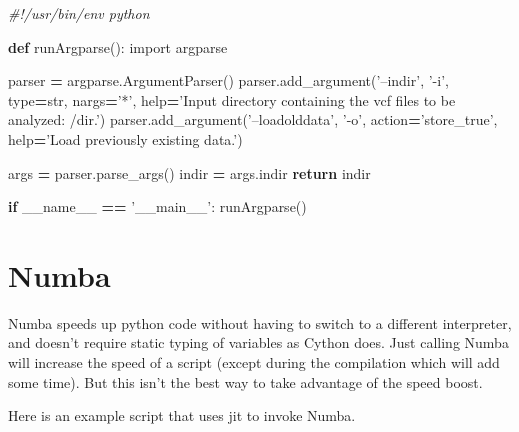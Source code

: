 \documentclass[]{book}
\newenvironment{Shaded}{\begin{snugshade}}{\end{snugshade}}
\newcommand{\BuiltInTok}[1]{#1}
\newcommand{\CommentTok}[1]{\textcolor[rgb]{0.56,0.35,0.01}{\textit{#1}}}
\newcommand{\ControlFlowTok}[1]{\textcolor[rgb]{0.13,0.29,0.53}{\textbf{#1}}}
\newcommand{\ImportTok}[1]{#1}
\newcommand{\KeywordTok}[1]{\textcolor[rgb]{0.13,0.29,0.53}{\textbf{#1}}}
\newcommand{\NormalTok}[1]{#1}
\newcommand{\OperatorTok}[1]{\textcolor[rgb]{0.81,0.36,0.00}{\textbf{#1}}}
\newcommand{\StringTok}[1]{\textcolor[rgb]{0.31,0.60,0.02}{#1}}
\newcommand{\VariableTok}[1]{\textcolor[rgb]{0.00,0.00,0.00}{#1}}
\begin{document}
\begin{Shaded}
\begin{Highlighting}[]
\CommentTok{#!/usr/bin/env python}

\KeywordTok{def}\NormalTok{ runArgparse():}
\ImportTok{import}\NormalTok{ argparse}

\NormalTok{parser }\OperatorTok{=}\NormalTok{ argparse.ArgumentParser()}
\NormalTok{parser.add_argument(}\StringTok{'--indir'}\NormalTok{, }\StringTok{'-i'}\NormalTok{, }\BuiltInTok{type}\OperatorTok{=}\BuiltInTok{str}\NormalTok{, nargs}\OperatorTok{=}\StringTok{'*'}\NormalTok{, }\BuiltInTok{help}\OperatorTok{=}\StringTok{'Input directory containing the vcf files to be analyzed: /dir.'}\NormalTok{)}
\NormalTok{parser.add_argument(}\StringTok{'--loadolddata'}\NormalTok{, }\StringTok{'-o'}\NormalTok{, action}\OperatorTok{=}\StringTok{'store_true'}\NormalTok{, }\BuiltInTok{help}\OperatorTok{=}\StringTok{'Load previously existing data.'}\NormalTok{)}

\NormalTok{args }\OperatorTok{=}\NormalTok{ parser.parse_args()}
\NormalTok{indir }\OperatorTok{=}\NormalTok{ args.indir}
\ControlFlowTok{return}\NormalTok{ indir}

\ControlFlowTok{if} \VariableTok{__name__} \OperatorTok{==} \StringTok{'__main__'}\NormalTok{:}
\NormalTok{    runArgparse()}
\end{Highlighting}
\end{Shaded}

\hypertarget{numba}{%
\section{Numba}\label{numba}}

Numba speeds up python code without having to switch to a different interpreter, and doesn't require static typing of variables as Cython does. Just calling Numba will increase the speed of a script (except during the compilation which will add some time). But this isn't the best way to take advantage of the speed boost.

Here is an example script that uses jit to invoke Numba.
\end{document}
